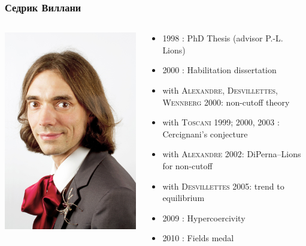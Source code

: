 \documentclass[mathserif]{beamer} %
\newcommand{\Cite}[2][]{\alert{\textsc{#2 #1}}}
\begin{document}
\begin{frame}
    \frametitle{Седрик Виллани}
    \begin{columns}
    \begin{column}{0.2\textwidth}
       \includegraphics{photos/villani3}
    \end{column}
    \begin{column}{0.8\textwidth}
        \begin{itemize}
            \item \Cite{1998}: PhD Thesis (advisor P.-L. Lions)
            \item \Cite{2000}: Habilitation dissertation
            \item with \Cite[2000]{Alexandre, Desvillettes, Wennberg}: non-cutoff theory
            \item with \Cite[1999]{Toscani}; \Cite{2000, 2003}: Cercignani's conjecture
            \item with \Cite[2002]{Alexandre}: DiPerna--Lions for non-cutoff
            \item with \Cite[2005]{Desvillettes}: trend to equilibrium
            \item \Cite{2009}: Hypercoercivity
            \item \Cite{2010}: Fields medal
        \end{itemize}
    \end{column}
    \end{columns}


\end{frame}
\end{document}
